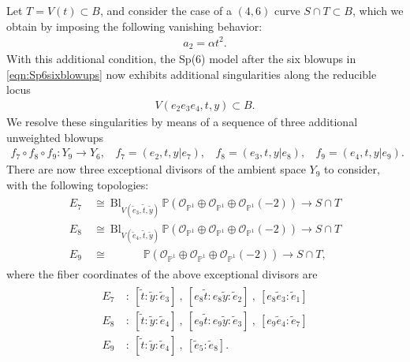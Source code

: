 \documentclass[11pt,oneside,english]{article}
\numberwithin{equation}{section}
\theoremstyle{definition}
\begin{document}
	Let $T = V(t) \subset B$, and consider the case of a $(4,6)$ curve $S \cap T \subset B$, which we obtain by imposing the following vanishing behavior:
		\begin{align}
			a_2 = \alpha t^2. 
		\end{align}	
	With this additional condition, the Sp(6) model after the six blowups in \cref{eqn:Sp6sixblowups} now exhibits additional singularities along the reducible locus
	\begin{align}
		V(e_2 e_3 e_4 , t ,y ) \subset B.
	\end{align}	
We resolve these singularities by means of a sequence of three additional unweighted blowups
	\begin{align}
\label{eqn:F6codim2blowups}
	 	f_7 \circ f_8 \circ f_9 : Y_9 \rightarrow Y_6,~~~~f_7 = (e_2 , t, y| e_7),~~~~ f_8 = (e_3,t, y|e_8),~~~~ f_9 = (e_4, t,y |e_9).
	\end{align}
There are now three exceptional divisors of the ambient space $Y_9$ to consider, with the following topologies:
	\begin{align}
		\begin{split}
		{E}_7 ~&\cong ~ \text{Bl}_{V(\tilde e_3 , \tilde t ,\tilde y )} \,\mathbb P(\mathcal O_{\mathbb P^1} \oplus \mathcal O_{\mathbb P^1} \oplus \mathcal O_{\mathbb P^1}(-2) )  \rightarrow S\cap T\\
			{E}_8 ~&\cong  ~\text{Bl}_{V( \tilde e_4 , \tilde t , \tilde y)} \,\mathbb P(\mathcal O_{\mathbb P^1} \oplus \mathcal O_{\mathbb P^1} \oplus \mathcal O_{\mathbb P^1}(-2) ) \rightarrow S\cap T\\
			{E}_9 ~&\cong ~ ~~~~~~~~~~~~\,\, \mathbb P(\mathcal O_{\mathbb P^1} \oplus \mathcal O_{\mathbb P^1} \oplus \mathcal O_{\mathbb P^1}(-2)) \rightarrow S\cap T,
		\end{split}	
	\end{align}
where the fiber coordinates of the above exceptional divisors are
	\begin{align}
		\begin{split}
			{E}_7~&: ~[\tilde t: \tilde y: \tilde e_3 ] ~,~ [ e_8 \tilde t: e_8 \tilde y: \tilde e_2 ] ~,~[  e_8\tilde e_3: \tilde e_1] \\
			{E}_8~&:~  [\tilde t: \tilde y: \tilde e_4 ] ~,~ [ e_9 \tilde t: e_9 \tilde y: \tilde e_3] ~,~[ e_9 \tilde e_4 : \tilde e_7]\\
			{E}_9 ~&:~ [ \tilde t: \tilde y: \tilde e_4] ~,~ [\tilde e_5 :\tilde e_8].
				\end{split}
	\end{align}
\end{document}
